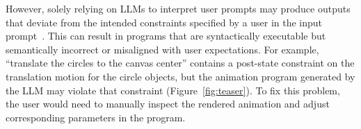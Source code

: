 However, solely relying on LLMs to interpret user prompts may produce
outputs that deviate from the intended constraints specified by a user
in the input prompt~\cite{tseng2024keyframer, liu2024logomotion}.
This can result in programs that are syntactically executable but
semantically incorrect or misaligned with user expectations.  For
example, ``translate the circles to the canvas center'' contains a
post-state constraint on the translation motion for the circle
objects, but the animation program generated by the LLM may violate
that constraint (Figure~\ref{fig:teaser}).  To fix this problem, the
user would need to manually inspect the rendered animation and adjust
corresponding parameters in the program.



